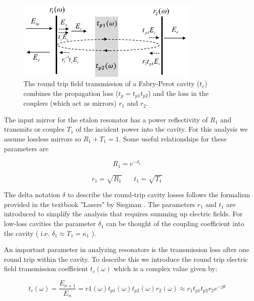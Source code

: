 \documentclass[10pt]{article}
\begin{document}
\begin{figure}[htbp]
\centering\includegraphics[width=0.8\textwidth]{figures/fp_v6}
\caption{
The round trip field transmission of a Fabry-Perot cavity ($t_c$) combines the propagation loss ($t_p =  t_{p1}t_{p2}$) and the loss in the couplers (which act as mirrors) $r_1$ and $r_2$. 
}
\label{fig:fp}
\end{figure}


The input mirror for the etalon resonator has a power reflectivity of $R_1$ and  transmits or couples $T_1$   of the incident power into the cavity.  For this analysis we assume lossless mirrors so $R_1 + T_1 = 1$.  Some useful relationships for these parameters are

\begin{equation}
R_1 = e^{-\delta_1}
\end{equation}

\begin{equation}
  r_1 = \sqrt{ R_1}  ~  ~  ~ ~ ~ ~  ~ ~  t_1 = \sqrt{ T_1}  
\end{equation}
 
The delta notation $\delta$ to describe the round-trip cavity losses follows the formalism provided in the textbook "Lasers" by Siegman \cite{Siegman1986}.  The parameters $r_1$ and $t_1$ are introduced to simplify the analysis that requires summing up electric fields.
For low-loss cavities the parameter $\delta_1$ can be thought of the coupling coefficient into the cavity ( i.e. $   \delta_1 \approx T_1 = \kappa_1$ ).    


An important parameter in analyzing resonators is the transmission loss after one round trip within the cavity.   To describe this we introduce the round trip electric field transmission coefficient $t_c (\omega)$  which is a complex value given by:

\begin{equation}
  t_c (\omega) = \frac{E_{n+1}}{E_n}  = r1(\omega) t_{p1}(\omega) t_{p2}(\omega)r_2(\omega) \approx r_1 t_{p1} t_{p2} r_2 e^{-j\theta}
\label{equ:tc}
\end{equation}
\end{document}
